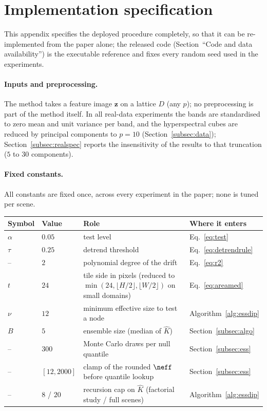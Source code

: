 \section{Implementation specification}\label{app:impl}

This appendix specifies the deployed procedure completely, so that it
can be re-implemented from the paper alone; the released code
(Section~``Code and data availability'') is the executable reference and
fixes every random seed used in the experiments.

\paragraph{Inputs and preprocessing.}
The method takes a feature image $\bm z$ on a lattice $D$ (any $p$); no
preprocessing is part of the method itself. In all real-data experiments the
bands are standardised to zero mean and unit variance per band, and the
hyperspectral cubes are reduced by principal components to $p=10$
(Section~\ref{subsec:data}); Section~\ref{subsec:realspec} reports the
insensitivity of the results to that truncation ($5$ to $30$ components).

\paragraph{Fixed constants.}
All constants are fixed once, across every experiment in the paper; none is
tuned per scene.
\begin{center}
\small
\begin{tabular}{llp{4.2cm}l}
\toprule
Symbol & Value & Role & Where it enters\\
\midrule
$\alpha$ & $0.05$ & test level & Eq.~\eqref{eq:test}\\
$\tau$   & $0.25$ & detrend threshold & Eq.~\eqref{eq:detrendrule}\\
--       & $2$    & polynomial degree of the drift & Eq.~\eqref{eq:r2}\\
$t$      & $24$   & tile side in pixels (reduced to
                    $\min(24,\lfloor H/2\rfloor,\lfloor W/2\rfloor)$ on
                    small domains) & Eq.~\eqref{eq:areamed}\\
$\nu$    & $12$   & minimum effective size to test a node &
                    Algorithm~\ref{alg:essdip}\\
$B$      & $5$    & ensemble size (median of $\hat K$) &
                    Section~\ref{subsec:algo}\\
--       & $300$  & Monte Carlo draws per null quantile &
                    Section~\ref{subsec:ess}\\
--       & $[12,2000]$ & clamp of the rounded $\neff$ before quantile lookup &
                    Section~\ref{subsec:ess}\\
--       & $8$ / $20$ & recursion cap on $\hat K$ (factorial study / full
                    scenes) & Algorithm~\ref{alg:essdip}\\
\bottomrule
\end{tabular}
\end{center}


